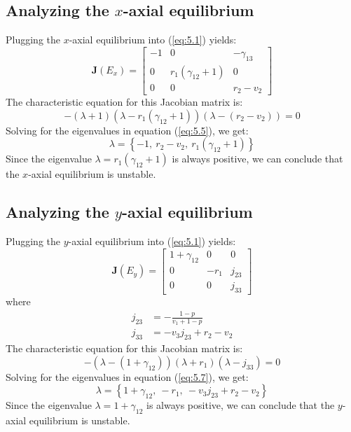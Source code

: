 \subsection{Analyzing the $x$-axial equilibrium}\label{subsec:stability_x_axial_equilibrium}
Plugging the $x$-axial equilibrium into (\ref{eq:5.1}) yields:
\begin{equation}
    \textbf{J}\left(E_x\right)=\begin{bmatrix}
        -1 & 0 & -\gamma_{13}\\
        0 & r_1\left(\gamma_{12}+1\right) & 0\\
        0 & 0 & r_2-v_2
    \end{bmatrix}
    \label{eq:5.4}
\end{equation}
The characteristic equation for this Jacobian matrix is:
\begin{equation}
    -\left(\lambda+1\right)\left(\lambda-r_1\left(\gamma_{12}+1\right)\right)\left(\lambda-\left(r_2-v_2\right)\right)=0
    \label{eq:5.5}
\end{equation}
Solving for the eigenvalues in equation (\ref{eq:5.5}), we get:
\[
\lambda=\left\{
-1, \
r_2-v_2, \
r_1\left(\gamma_{12}+1\right)
\right\}
\]
Since the eigenvalue $\lambda=r_1\left(\gamma_{12}+1\right)$ is always positive, we can conclude that the $x$-axial equilibrium is unstable.

\subsection{Analyzing the $y$-axial equilibrium}\label{subsec:stability_y_axial_equilibrium}
Plugging the $y$-axial equilibrium into (\ref{eq:5.1}) yields:
\begin{equation}
    \textbf{J}\left(E_y\right)=\begin{bmatrix}
        1+\gamma_{12} & 0 & 0\\
        0 & -r_1 & j_{23}\\
        0 & 0 & j_{33}
    \end{bmatrix}
    \label{eq:5.6}
\end{equation}
where
\begin{align*}
    j_{23} &= -\frac{1-p}{v_1+1-p}\\
    j_{33} &= -v_3j_{23}+r_2-v_2
\end{align*}
The characteristic equation for this Jacobian matrix is:
\begin{equation}
    -\left(\lambda-\left(1+\gamma_{12}\right)\right)\left(\lambda+r_1\right)\left(\lambda-j_{33}\right)=0
    \label{eq:5.7}
\end{equation}
Solving for the eigenvalues in equation (\ref{eq:5.7}), we get:
\[
\lambda=\left\{
1+\gamma_{12}, \
-r_1, \
-v_3j_{23}+r_2-v_2
\right\}
\]
Since the eigenvalue $\lambda=1+\gamma_{12}$ is always positive, we can conclude that the $y$-axial equilibrium is unstable.

